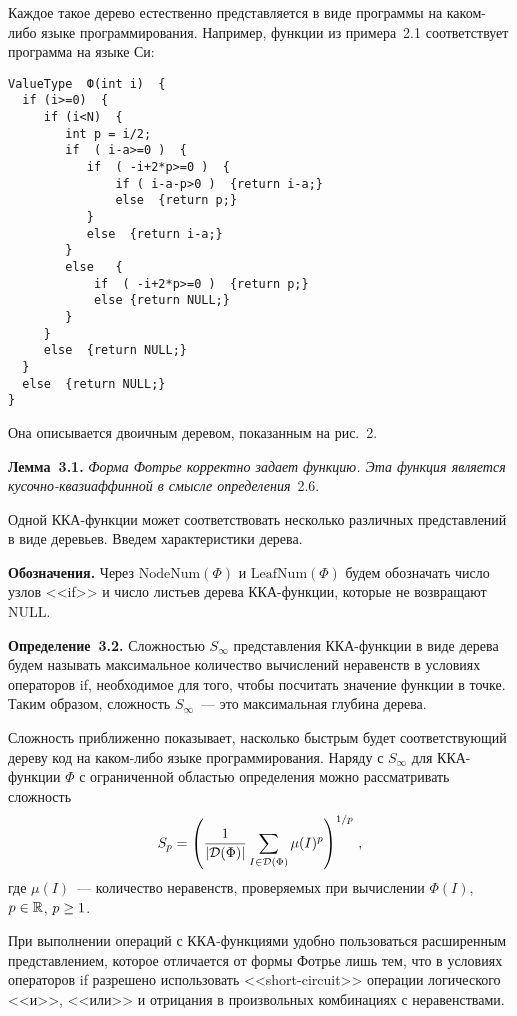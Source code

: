 \begin{multicols}{2}
Каждое такое дерево естественно представляется в виде программы на 
каком-либо языке программирования. Например, функции из примера~2.1
соответствует программа на языке Си:
\begin{verbatim}
ValueType  Ф(int i)  {
  if (i>=0)  {
     if (i<N)  {
        int p = i/2;
        if  ( i-a>=0 )  {
           if  ( -i+2*p>=0 )  {
               if ( i-a-p>0 )  {return i-a;}
               else  {return p;}
           }
           else  {return i-a;}
        }
        else   {
            if  ( -i+2*p>=0 )  {return p;}
            else {return NULL;}
        }
     }
     else  {return NULL;}
  }
  else  {return NULL;}
}
\end{verbatim}
Она описывается двоичным деревом, показанным на рис.~2.


\smallskip

\noindent
\textbf{Лемма~3.1.}
\textit{Форма Фотрье корректно задает функцию. Эта функция является 
кусочно-квазиаффинной в смысле определения}~2.6.

\smallskip

Одной ККА-функции может соответствовать несколько различных представлений в виде де\-ревь\-ев. 
Введем характеристики дерева.

\noindent
\textbf{Обозначения.} Через $\mathrm{NodeNum}(\Phi)$ и
$\mathrm{LeafNum}(\Phi)$ будем обозначать число узлов <<if>> и число
листь\-ев дерева ККА-функ\-ции, которые не возвращают NULL.

\smallskip

\noindent
\textbf{Определение~3.2.}
Сложностью $S_\infty$ представления ККА-функции в виде дерева будем
называть максимальное количество вычислений неравенств в условиях
операторов if, необходимое для того, чтобы посчитать значение
функции в точке. Таким образом, сложность $S_\infty$~--- это
максимальная глубина дерева.

\smallskip

Сложность приближенно показывает, насколько быстрым будет
соответствующий дереву код на ка\-ком-ли\-бо языке программирования.
Наряду с $S_\infty$ для ККА-функции $\Phi$ с ограниченной областью
определения можно рассматривать сложность 
$$
S_p=\left(\displaystyle\frac{\displaystyle 1\mathstrut}{\displaystyle |{\cal D}(\Phi)|\mathstrut} \sum\limits_{I\in{\cal D}(\Phi)} \mu(I)^p
\right)^{1/p}\,,
$$ 
где $\mu(I)$~--- количество неравенств,
проверяемых при вычислении $\Phi(I)$, $p\hm\in\mathbb{R}$, $p\hm\geq1$.

При выполнении операций с ККА-функциями удобно пользоваться
расширенным представлением, которое отличается от формы Фотрье лишь
тем, что в условиях операторов if разрешено использовать
<<short-circuit>> операции логического <<и>>, <<или>> и отрицания в
произвольных комбинациях с неравенствами.


\end{multicols}
